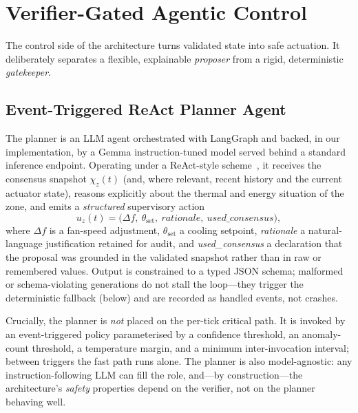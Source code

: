 \documentclass[preprint,11pt]{elsarticle}
\begin{document}
\section{Verifier-Gated Agentic Control}
\label{sec:agentic}

The control side of the architecture turns validated state into safe
actuation. It deliberately separates a flexible, explainable
\emph{proposer} from a rigid, deterministic \emph{gatekeeper}.

\subsection{Event-Triggered ReAct Planner Agent}
\label{sec:planner}

The planner is an LLM agent orchestrated with LangGraph and backed, in
our implementation, by a Gemma instruction-tuned model served behind a
standard inference endpoint. Operating under a ReAct-style
scheme~\cite{yao2023react}, it receives the consensus snapshot
$\chi_z(t)$ (and, where relevant, recent history and the current
actuator state), reasons explicitly about the thermal and energy
situation of the zone, and emits a \emph{structured} supervisory action
\begin{equation}
u_z(t)=\bigl(\Delta f,\ \theta_{\mathrm{set}},\
\textit{rationale},\ \textit{used\_consensus}\bigr),
\label{eq:action}
\end{equation}
where $\Delta f$ is a fan-speed adjustment, $\theta_{\mathrm{set}}$ a
cooling setpoint, \textit{rationale} a natural-language justification
retained for audit, and \textit{used\_consensus} a declaration that the
proposal was grounded in the validated snapshot rather than in raw or
remembered values. Output is constrained to a typed JSON schema;
malformed or schema-violating generations do not stall the loop---they
trigger the deterministic fallback (below) and are recorded as handled
events, not crashes.

Crucially, the planner is \emph{not} placed on the per-tick critical
path. It is invoked by an event-triggered policy parameterised by a
confidence threshold, an anomaly-count threshold, a temperature margin,
and a minimum inter-invocation interval; between triggers the fast path
runs alone. The planner is also model-agnostic: any
instruction-following LLM can fill the role, and---by construction---the
architecture's \emph{safety} properties depend on the verifier, not on
the planner behaving well.
\end{document}
